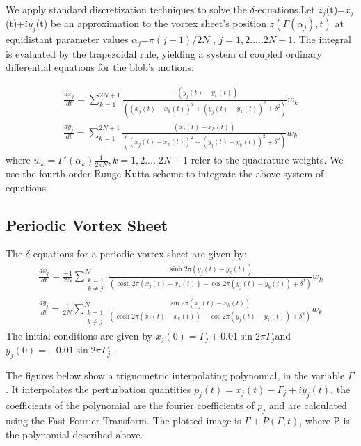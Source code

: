 \documentclass[12pt]{article}
\begin{document}
We apply standard discretization techniques to solve the $\delta$-equations.Let $z_j$(t)=$x_j$(t)+$iy_j$(t) be an approximation to the vortex sheet's position $z(\Gamma(\alpha_j),t)$ at equidistant parameter values $\alpha_j$=$\pi(j-1)/2N$ , $j=1,2.....2N+1$. The integral is evaluated by the trapezoidal rule, yielding a system of coupled ordinary differential equations for the blob's motions:

\begin{subequations}
\begin{align}
\frac{d x_j}{d t} = \sum_{k=1}^{2N+1}{\frac{-(y_j(t)-y_k(t))}{((x_j(t)-x_k(t))^2 + (y_j(t)-y_k(t))^2 + \delta^2)}}w_k\\
\frac{d y_j}{d t} = \sum_{k=1}^{2N+1}{\frac{(x_j(t)-x_k(t))}{((x_j(t)-x_k(t))^2 + (y_j(t)-y_k(t))^2 + \delta^2)}}w_k
\end{align}
\end{subequations}
where $w_k=\Gamma'(\alpha_k)\frac{1}{2\pi N},k=1,2.....2N+1$ refer to the quadrature weights. We use the fourth-order Runge Kutta scheme to integrate the above system of equations.
\subsection{Periodic Vortex Sheet}
The $\delta$-equations for a periodic vortex-sheet are given by:
\begin{subequations}
\begin{align}
\frac{d x_j}{d t}  =\frac{-1}{2N} \sum_{{\substack{k=1 \\ k\neq j}}}^{N}{\frac{\sinh2\pi(y_j(t)-y_k(t))}{(\cosh2\pi(x_j(t)-x_k(t)) - \cos2\pi(y_j(t)-y_k(t)) + \delta^2)}}w_k\\
\frac{d y_j}{d t}=\frac{1}{2N} \sum_{{\substack{k=1 \\ k\neq j}}}^{N}{\frac{\sin2\pi(x_j(t)-x_k(t))}{(\cosh2\pi(x_j(t)-x_k(t)) - \cos2\pi(y_j(t)-y_k(t)) + \delta^2)}}w_k
\end{align}
\end{subequations}
The initial conditions are given by
$x_j(0)=\Gamma_j+0.01\sin2\pi\Gamma_j$and $y_j(0)=-0.01\sin2\pi\Gamma_j$ . 

The figures below show a trignometric interpolating polynomial, in the variable $\Gamma$. It interpolates the perturbation quantities $p_j(t)=x_j(t)-\Gamma_j + iy_j(t)$, the coefficients of the polynomial are the fourier coefficients of $p_j$ and are calculated using the Fast Fourier Transform. The plotted image is $\Gamma + P(\Gamma,t)$, where P is the polynomial described above.
\end{document}
